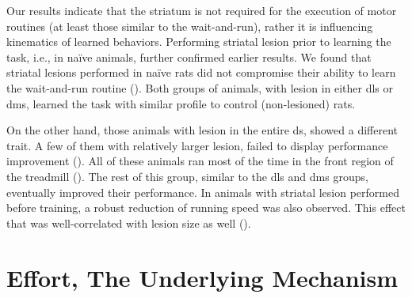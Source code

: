 Our results indicate that the striatum is not required for the execution of motor routines (at least those similar to the wait-and-run), rather it is influencing kinematics of learned behaviors.
Performing striatal lesion prior to learning the task, i.e., in na\"{i}ve animals, further confirmed earlier results.
We found that striatal lesions performed in na\"{i}ve rats did not compromise their ability to learn the wait-and-run routine ().
Both groups of animals, with lesion in either \gls{dls} or \gls{dms}, learned the task with similar profile to control (non-lesioned) rats.

On the other hand, those animals with lesion in the entire \gls{ds}, showed a different trait.
A few of them with relatively larger lesion, failed to display performance improvement ().
All of these animals ran most of the time in the front region of the treadmill ().
The rest of this group, similar to the \gls{dls} and \gls{dms} groups, eventually improved their performance.
In animals with striatal lesion performed before training, a robust reduction of running speed was also observed.
This effect that was well-correlated with lesion size as well ().


\section{Effort, The Underlying Mechanism}
\label{ch:lesion:effort}


